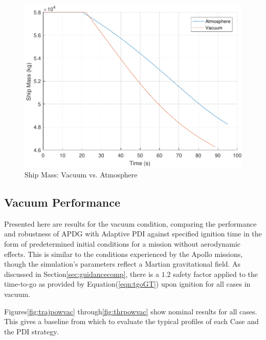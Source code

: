 \begin{figure}[H]
	\centering
	\begin{minipage}{4.3 in}
		\includegraphics[width=\linewidth]{Figures/massatmovsvac.pdf}
		\caption{Ship Mass: Vacuum vs. Atmosphere \label{fig:massatmovsvac} }
	\end{minipage}
\end{figure}



\subsection{Vacuum Performance} \label{sec:vacperf}

Presented here are results for the vacuum condition, comparing the performance and robustness of APDG with Adaptive PDI against specified ignition time in the form of predetermined initial conditions for a mission without aerodynamic effects. This is similar to the conditions experienced by the Apollo missions, though the simulation's parameters reflect a Martian gravitational field. As discussed in Section\:\ref{sec:guidancecomp}, there is a $1.2$ safety factor applied to the time-to-go as provided by Equation\:(\ref{eqn:tgoGT}) upon ignition for all cases in vacuum.

Figures\:\ref{fig:trajpowvac} through\:\ref{fig:thrpowvac} show nominal results for all cases. This gives a baseline from which to evaluate the typical profiles of each Case and the PDI strategy. 

